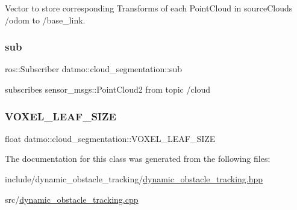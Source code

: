 Vector to store corresponding Transforms of each Point\+Cloud in source\+Clouds /odom to /base\+\_\+link. 

\mbox{\label{classdatmo_1_1cloud__segmentation_a72e340852b66e150cb7f0e25214b7439}} 
\subsubsection{\texorpdfstring{sub}{sub}}
{\footnotesize\ttfamily ros\+::\+Subscriber datmo\+::cloud\+\_\+segmentation\+::sub\hspace{0.3cm}{\ttfamily [protected]}}



subscribes sensor\+\_\+msgs\+::\+Point\+Cloud2 from topic /cloud 

\mbox{\label{classdatmo_1_1cloud__segmentation_af6f1f8553f2a18176ae84b78ddea07c9}} 
\subsubsection{\texorpdfstring{V\+O\+X\+E\+L\+\_\+\+L\+E\+A\+F\+\_\+\+S\+I\+ZE}{VOXEL\_LEAF\_SIZE}}
{\footnotesize\ttfamily float datmo\+::cloud\+\_\+segmentation\+::\+V\+O\+X\+E\+L\+\_\+\+L\+E\+A\+F\+\_\+\+S\+I\+ZE\hspace{0.3cm}{\ttfamily [protected]}}



The documentation for this class was generated from the following files\+:\begin{DoxyCompactItemize}
\item 
include/dynamic\+\_\+obstacle\+\_\+tracking/\hyperlink{dynamic__obstacle__tracking_8hpp}{dynamic\+\_\+obstacle\+\_\+tracking.\+hpp}\item 
src/\hyperlink{dynamic__obstacle__tracking_8cpp}{dynamic\+\_\+obstacle\+\_\+tracking.\+cpp}\end{DoxyCompactItemize}
